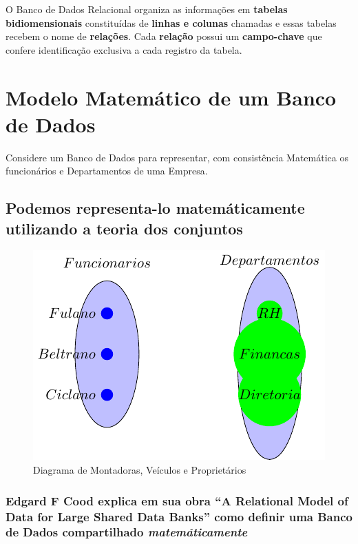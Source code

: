 \documentclass[
]{book}
\begin{document}
O Banco de Dados Relacional organiza as informações em \textbf{tabelas bidiomensionais} constituídas de \textbf{linhas e colunas} chamadas e essas tabelas recebem o nome de \textbf{relações}. Cada \textbf{relação} possui um \textbf{campo-chave} que confere identificação exclusiva a cada registro da tabela.

\section{Modelo Matemático de um Banco de Dados}\label{modelo-matemuxe1tico-de-um-banco-de-dados}

Considere um Banco de Dados para representar, com consistência Matemática os
funcionários e Departamentos de uma Empresa.

\subsection{Podemos representa-lo matemáticamente utilizando a teoria dos conjuntos}\label{podemos-representa-lo-matemuxe1ticamente-utilizando-a-teoria-dos-conjuntos}

\begin{figure}
\centering
\includegraphics{2025-GTI-Sem-BancoDeDados_files/figure-latex/tikz-diagrama0-1.pdf}
\caption{\label{fig:tikz-diagrama0}Diagrama de Montadoras, Veículos e Proprietários}
\end{figure}

\subsubsection{\texorpdfstring{Edgard F Cood explica em sua obra ``A Relational Model of Data for Large Shared Data Banks'' como definir uma Banco de Dados compartilhado \emph{matemáticamente}}{Edgard F Cood explica em sua obra ``A Relational Model of Data for Large Shared Data Banks'' como definir uma Banco de Dados compartilhado matemáticamente}}\label{edgard-f-cood-explica-em-sua-obra-a-relational-model-of-data-for-large-shared-data-banks-como-definir-uma-banco-de-dados-compartilhado-matemuxe1ticamente}
\end{document}
